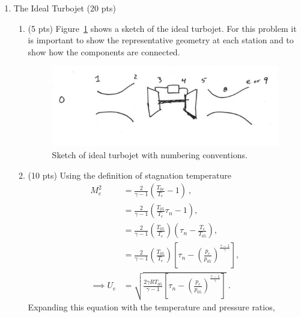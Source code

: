 \documentclass[12pt]{article}
\begin{document}
\begin{enumerate}[label=(\alph*)]
	\item 
		The Ideal Turbojet (20 pts)
		\begin{enumerate}[label=(\roman{*})]
			\item  (5 pts)
				Figure~\ref{FIG_2_IDEAL} shows a sketch of the ideal turbojet. For this problem it is important to show the representative geometry at each station and to show how the components are connected.
				
				\begin{figure}[!ht!]
					\begin{center}
						\includegraphics[width=120mm]{problem2ai.png}
						\caption{\label{FIG_2_IDEAL} Sketch of ideal turbojet with numbering conventions.}
					\end{center}
				\end{figure}
			\item (10 pts)
				Using the definition of stagnation temperature
				\begin{equation}
					\begin{aligned}
						M_e^2&=\frac{2}{\gamma-1}\left(\frac{T_{0e}}{T_e}-1\right)\ , \\
						&= \frac{2}{\gamma-1}\left(\frac{T_{05}}{T_e}\tau_n-1\right), \\
						&= \frac{2}{\gamma-1}\left(\frac{T_{05}}{T_{e}}\right)\left(\tau_n-\frac{T_{e}}{T_{05}}\right), \\
						&= \frac{2}{\gamma-1}\left(\frac{T_{05}}{T_{e}}\right)\left[\tau_n-\left(\frac{p_{e}}{p_{05}}\right)^{\frac{\gamma-1}{\gamma}}\right], \\
						\implies U_e&=\sqrt{\frac{2\gamma RT_{05}}{\gamma-1}\left[\tau_n-\left(\frac{p_{e}}{p_{05}}\right)^{\frac{\gamma-1}{\gamma}}\right]}\ .
					\end{aligned}
				\end{equation}
				Expanding this equation with the temperature and pressure ratios,
				\begin{equation}
					\label{EQ_2_UE}
					\begin{aligned}

\end{aligned}
\end{equation}
\end{enumerate}
\end{enumerate}
\end{document}
